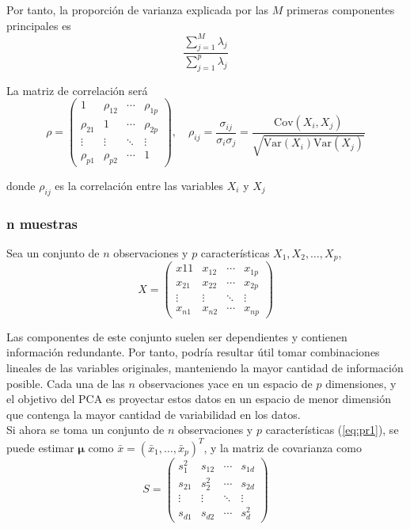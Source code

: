 \noindent Por tanto, la proporción de varianza explicada por las $M$ primeras componentes principales es
\begin{equation}
\frac{\sum_{j=1}^M \lambda_j}{\sum_{j=1}^p \lambda_j}
\end{equation}

\noindent La matriz de correlación será 
\begin{equation}
\rho = \begin{pmatrix}  
1 & \rho_{12} & \cdots & \rho_{1p} \\
\rho_{21} & 1 & \cdots & \rho_{2p} \\
\vdots & \vdots & \ddots & \vdots \\
\rho_{p1} & \rho_{p2} & \cdots & 1
\end{pmatrix}, \quad \rho_{ij} = \frac{\sigma_{ij}}{\sigma_i \sigma_j} = \frac{\text{Cov}(X_i, X_j)}{\sqrt{\text{Var}(X_i) \text{Var}(X_j)}}
\end{equation}

\noindent donde $\rho_{ij}$ es la correlación entre las variables $X_i$ y $X_j$


\subsubsection{n muestras}

Sea un conjunto de $n$ observaciones y $p$ características $X_1, X_2, \ldots, X_p$, 
\begin{equation}
X = \begin{pmatrix}
x{11} & x_{12} & \cdots & x_{1p} \\
x_{21} & x_{22} & \cdots & x_{2p} \\
\vdots & \vdots & \ddots & \vdots \\
x_{n1} & x_{n2} & \cdots & x_{np}
\end{pmatrix}
\label{eq:pr1}
\end{equation}

Las componentes de este conjunto suelen ser dependientes y contienen información redundante. Por tanto, podría resultar útil tomar combinaciones lineales de las variables originales, manteniendo la mayor cantidad de información posible. Cada una de las $n$ observaciones yace en un espacio de $p$ dimensiones, y el objetivo del PCA es proyectar estos datos en un espacio de menor dimensión que contenga la mayor cantidad de variabilidad en los datos. \\

Si ahora se toma un conjunto de $n$ observaciones y $p$ características (\ref{eq:pr1}), se puede estimar $\boldsymbol{\mu}$ como $\bar{x} = (\bar{x}_1, \dots, \bar{x}_p)^T$, y la matriz de covarianza como 
\begin{equation}
S = \begin{pmatrix}
s_1^2 & s_{12} & \cdots & s_{1d} \\
s_{21} & s_2^2 & \cdots & s_{2d} \\
\vdots & \vdots & \ddots & \vdots \\
s_{d1} & s_{d2} & \cdots & s_d^2
\end{pmatrix}
\end{equation}

